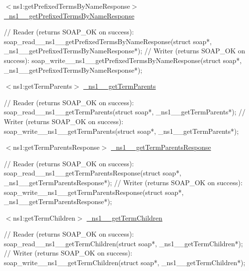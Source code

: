 \begin{DoxyItemize}
\item $<$ns1:getPrefixedTermsByNameResponse$>$ \hyperlink{class__ns1____getPrefixedTermsByNameResponse}{\_\-ns1\_\-\_\-getPrefixedTermsByNameResponse} 
\begin{DoxyCode}
    // Reader (returns SOAP_OK on success):
    soap_read__ns1__getPrefixedTermsByNameResponse(struct soap*, 
      _ns1__getPrefixedTermsByNameResponse*);
    // Writer (returns SOAP_OK on success):
    soap_write__ns1__getPrefixedTermsByNameResponse(struct soap*, 
      _ns1__getPrefixedTermsByNameResponse*);
\end{DoxyCode}

\end{DoxyItemize}


\begin{DoxyItemize}
\item $<$ns1:getTermParents$>$ \hyperlink{class__ns1____getTermParents}{\_\-ns1\_\-\_\-getTermParents} 
\begin{DoxyCode}
    // Reader (returns SOAP_OK on success):
    soap_read__ns1__getTermParents(struct soap*, _ns1__getTermParents*);
    // Writer (returns SOAP_OK on success):
    soap_write__ns1__getTermParents(struct soap*, _ns1__getTermParents*);
\end{DoxyCode}

\end{DoxyItemize}


\begin{DoxyItemize}
\item $<$ns1:getTermParentsResponse$>$ \hyperlink{class__ns1____getTermParentsResponse}{\_\-ns1\_\-\_\-getTermParentsResponse} 
\begin{DoxyCode}
    // Reader (returns SOAP_OK on success):
    soap_read__ns1__getTermParentsResponse(struct soap*, 
      _ns1__getTermParentsResponse*);
    // Writer (returns SOAP_OK on success):
    soap_write__ns1__getTermParentsResponse(struct soap*, 
      _ns1__getTermParentsResponse*);
\end{DoxyCode}

\end{DoxyItemize}


\begin{DoxyItemize}
\item $<$ns1:getTermChildren$>$ \hyperlink{class__ns1____getTermChildren}{\_\-ns1\_\-\_\-getTermChildren} 
\begin{DoxyCode}
    // Reader (returns SOAP_OK on success):
    soap_read__ns1__getTermChildren(struct soap*, _ns1__getTermChildren*);
    // Writer (returns SOAP_OK on success):
    soap_write__ns1__getTermChildren(struct soap*, _ns1__getTermChildren*);
\end{DoxyCode}

\end{DoxyItemize}


